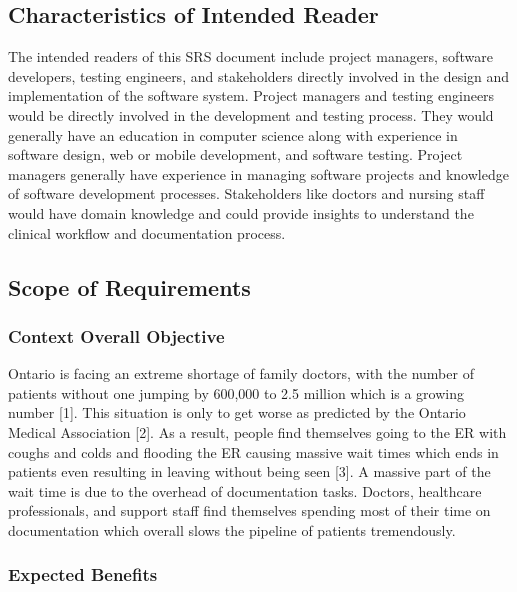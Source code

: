 \documentclass[12pt]{article}
\begin{document}
\subsection{Characteristics of Intended Reader} \label{sec_IntendedReader} 

The intended readers of this SRS document include project managers, software developers, testing engineers, and stakeholders directly involved in the design and implementation of the software system. Project managers and testing engineers would be directly involved in the development and testing process. They would generally have an education in computer science along with experience in software design, web or mobile development, and software testing. Project managers generally have experience in managing software projects and knowledge of software development processes. Stakeholders like doctors and nursing staff would have domain knowledge and could provide insights to understand the clinical workflow and documentation process. 

\subsection{Scope of Requirements} \label{sec_ScopeOfRequirements}


\subsubsection{Context Overall Objective} \label{sec_ContextOverallObjective}

Ontario is facing an extreme shortage of family doctors, with the number of patients without one jumping by 600,000 to 2.5 million which is a growing number [1]. This situation is only to get worse as predicted by the Ontario Medical Association [2]. As a result, people find themselves going to the ER with coughs and colds and flooding the ER causing massive wait times which ends in patients even resulting in leaving without being seen [3]. A massive part of the wait time is due to the overhead of documentation tasks. Doctors, healthcare professionals, and support staff find themselves spending most of their time on documentation which overall slows the pipeline of patients tremendously.

\subsubsection{Expected Benefits} \label{sec_ExpectedBenefits}
\end{document}
